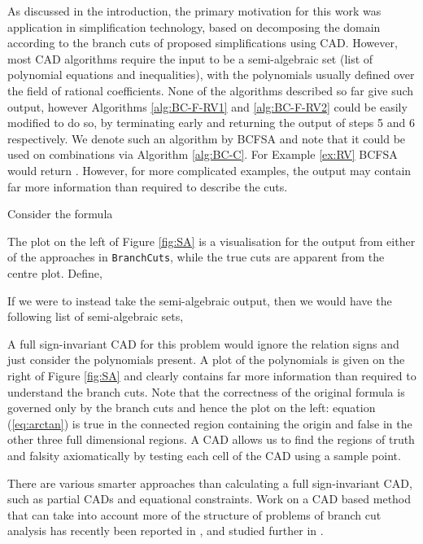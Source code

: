 \documentclass{llncs}
\begin{document}
As discussed in the introduction, the primary motivation for this work was application in simplification technology, based on decomposing the domain according to the branch cuts of proposed simplifications using CAD.  However, most CAD algorithms require the input to be a semi-algebraic set (list of polynomial equations and inequalities), with the polynomials usually defined over the field of rational coefficients.  None of the algorithms described so far give such output, however Algorithms \ref{alg:BC-F-RV1} and \ref{alg:BC-F-RV2} could be easily modified to do so, by terminating early and returning the output of steps 5 and 6 respectively.  We denote such an algorithm by BCFSA and note that it could be used on combinations via Algorithm \ref{alg:BC-C}.  
For Example \ref{ex:RV} BCFSA would return .  However, for more complicated examples, the output may contain far more information than required to describe the cuts.

\begin{example}
\label{ex:SA}
Consider the formula 

The plot on the left of Figure \ref{fig:SA} is a visualisation for the output from either of the approaches in \texttt{BranchCuts}, while the true cuts are apparent from the centre plot.
Define, 

If we were to instead take the semi-algebraic output, then we would have the following list of semi-algebraic sets,

A full sign-invariant CAD for this problem would ignore the relation signs and just consider the polynomials present.  A plot of the polynomials is given on the right of Figure \ref{fig:SA} and clearly contains far more information than required to understand the branch cuts.  Note that the correctness of the original formula is governed only by the branch cuts and hence the plot on the left: equation (\ref{eq:arctan}) is true in the connected region containing the origin and false in the other three full dimensional regions.  A CAD allows us to find the regions of truth and falsity axiomatically by testing each cell of the CAD using a sample point.
\end{example}

There are various smarter approaches than calculating a full sign-invariant CAD, such as partial CADs and equational constraints.  Work on a CAD based method that can take into account more of the structure of problems of branch cut analysis has recently been reported in \cite{BDEMW13}, and studied further in \cite{BDEW13}.
\end{document}
